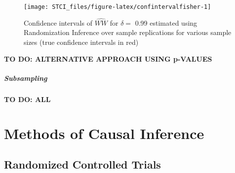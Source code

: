 \documentclass[]{book}
\newenvironment{Shaded}{\begin{snugshade}}{\end{snugshade}}
\newcommand{\DataTypeTok}[1]{\textcolor[rgb]{0.13,0.29,0.53}{#1}}
\newcommand{\DecValTok}[1]{\textcolor[rgb]{0.00,0.00,0.81}{#1}}
\newcommand{\KeywordTok}[1]{\textcolor[rgb]{0.13,0.29,0.53}{\textbf{#1}}}
\newcommand{\NormalTok}[1]{#1}
\newcommand{\OperatorTok}[1]{\textcolor[rgb]{0.81,0.36,0.00}{\textbf{#1}}}
\newcommand{\StringTok}[1]{\textcolor[rgb]{0.31,0.60,0.02}{#1}}
\theoremstyle{definition}
\theoremstyle{definition}
\theoremstyle{definition}
\theoremstyle{remark}
\begin{document}
\begin{Shaded}
\end{Shaded}

\begin{figure}[htbp]

{\centering \texttt{[image: STCI\_files/figure-latex/confintervalfisher-1]} 

}

\caption{Confidence intervals of $\hat{WW}$ for $\delta=$ 0.99 estimated using Randomization Inference over sample replications for various sample sizes (true confidence intervals in red)}\label{fig:confintervalfisher}
\end{figure}

\textbf{TO DO: ALTERNATIVE APPROACH USING p-VALUES}

\hypertarget{subsampling}{%
\subsubsection{Subsampling}\label{subsampling}}

\textbf{TO DO: ALL}

\hypertarget{part-methods-of-causal-inference}{%
\part{Methods of Causal Inference}\label{part-methods-of-causal-inference}}

\hypertarget{RCT}{%
\chapter{Randomized Controlled Trials}\label{RCT}}
\end{document}
